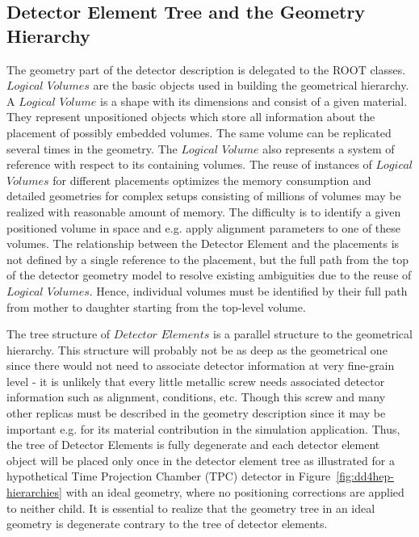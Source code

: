 \documentclass[10pt,a4paper]{article}
\begin{document}
\subsection{Detector Element Tree and the Geometry Hierarchy}
\label{subsect:detelement-hierarchy}
\noindent
The geometry part of the detector description is delegated to the ROOT classes.
$Logical$ $Volumes$ are the basic objects used in building the geometrical hierarchy. 
A $Logical$ $Volume$ is a shape with its dimensions and consist of a given material. 
They represent unpositioned objects which store all information about 
the placement of possibly embedded volumes. The same
volume can be replicated several times in the geometry. The $Logical$ $Volume$ 
also represents a system of reference with respect to its containing volumes.
The reuse of instances of $Logical$ $Volumes$ for different placements 
optimizes the memory consumption and detailed geometries for complex setups
consisting of millions of volumes may be realized with reasonable amount of memory.
The difficulty is to identify a given positioned volume 
in space and e.g. apply alignment parameters to one of these volumes. 
The relationship between the Detector Element and the placements
is not defined by a single reference to the placement, but the full path 
from the top of the detector geometry model to resolve existing
ambiguities due to the reuse of $Logical$ $Volumes$.
Hence, individual volumes must be identified by their full path from mother 
to daughter starting from the top-level volume. 

\noindent
The tree structure of
$Detector$ $Elements$ is a parallel structure to the geometrical hierarchy.
This structure will probably not be as deep as the geometrical one since 
there would not need to associate detector information at very fine-grain 
level - it is unlikely that every little metallic screw
needs associated detector information such as alignment, conditions, etc.
Though this screw and many other replicas must be described in the geometry 
description since it may be important e.g. for its material contribution 
in the simulation application. Thus, the tree of Detector Elements is
fully degenerate and each detector element object will be placed only 
once in the detector element tree as illustrated for a hypothetical
Time Projection Chamber (TPC) detector in 
Figure~\ref{fig:dd4hep-hierarchies} with an ideal geometry,
where no positioning corrections are applied to neither child. 
It is essential to realize that the geometry tree in an ideal geometry is
degenerate contrary to the tree of detector elements.
\end{document}
